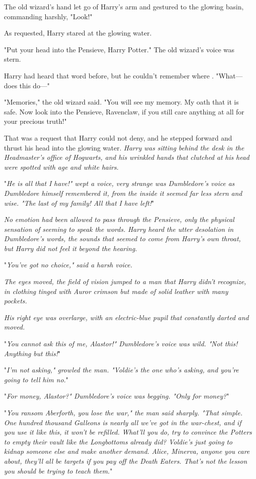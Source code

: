The old wizard's hand let go of Harry's arm and gestured to the glowing basin, 
commanding harshly, "Look!"

As requested, Harry stared at the glowing water.

"Put your head into the Pensieve, Harry Potter." The old wizard's voice was 
stern.

Harry had heard that word before, but he couldn't remember where . "What---does 
this do---"

"Memories," the old wizard said. "You will see my memory. My oath that it is 
safe. Now look into the Pensieve, Ravenclaw, if you still care anything at all 
for your precious truth!"

That was a request that Harry could not deny, and he stepped forward and thrust 
his head into the glowing water.
\sbreak
\emph{Harry was sitting behind the desk in the Headmaster's office of Hogwarts, 
and his wrinkled hands that clutched at his head were spotted with age and 
white hairs.}

"\emph{He is all that I have!" wept a voice, very strange was Dumbledore's 
voice as Dumbledore himself remembered it, from the inside it seemed far less 
stern and wise. "The last of my family! All that I have left!}"

\emph{No emotion had been allowed to pass through the Pensieve, only the 
physical sensation of seeming to speak the words. Harry heard the utter 
desolation in Dumbledore's words, the sounds that seemed to come from Harry's 
own throat, but Harry did not feel it beyond the hearing.}

"\emph{You've got no choice," said a harsh voice.}

\emph{The eyes moved, the field of vision jumped to a man that Harry didn't 
recognize, in clothing tinged with Auror crimson but made of solid leather with 
many pockets.}

\emph{His right eye was overlarge, with an electric-blue pupil that constantly 
darted and moved.}

"\emph{You cannot ask this of me, Alastor!" Dumbledore's voice was wild. "Not 
this! Anything but this!}"

"\emph{I'm not asking," growled the man. "Voldie's the one who's asking, and 
you're going to tell him no.}"

"\emph{For money, Alastor?" Dumbledore's voice was begging. "Only for money?}"

"\emph{You ransom Aberforth, you lose the war," the man said sharply. "That 
simple. One hundred thousand Galleons is nearly all we've got in the war-chest, 
and if you use it like this, it won't be refilled. What'll you do, try to 
convince the Potters to empty their vault like the Longbottoms already did? 
Voldie's just going to kidnap someone else and make another demand. Alice, 
Minerva, anyone you care about, they'll all be targets if you pay off the Death 
Eaters. That's not the lesson you should be trying to teach them.}"

